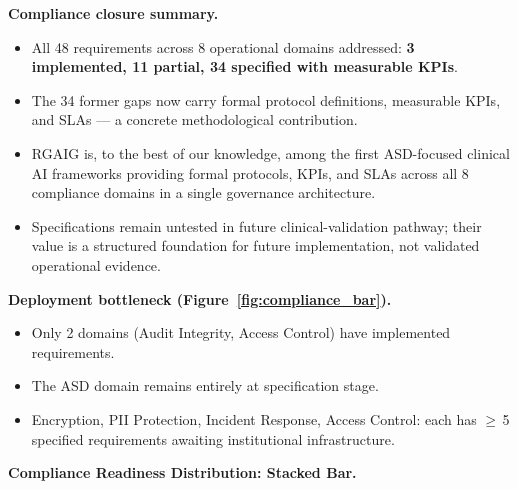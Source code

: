 \noindent\textbf{Compliance closure summary.}
\begin{itemize}[leftmargin=*, itemsep=2pt]
    \item All 48 requirements across 8 operational domains addressed: \textbf{3 implemented, 11 partial, 34 specified with measurable KPIs}.
    \item The 34 former gaps now carry formal protocol definitions, measurable KPIs, and SLAs --- a concrete methodological contribution.
    \item RGAIG is, to the best of our knowledge, among the first ASD-focused clinical AI frameworks providing formal protocols, KPIs, and SLAs across all 8 compliance domains in a single governance architecture.
    \item Specifications remain untested in future clinical-validation pathway; their value is a structured foundation for future implementation, not validated operational evidence.
\end{itemize}

\noindent\textbf{Deployment bottleneck (Figure~\ref{fig:compliance_bar}).}
\begin{itemize}[leftmargin=*, itemsep=2pt]
    \item Only 2 domains (Audit Integrity, Access Control) have implemented requirements.
    \item The ASD domain remains entirely at specification stage.
    \item Encryption, PII Protection, Incident Response, Access Control: each has $\geq$\,5 specified requirements awaiting institutional infrastructure.
\end{itemize}

\noindent\textbf{Compliance Readiness Distribution: Stacked Bar.}

